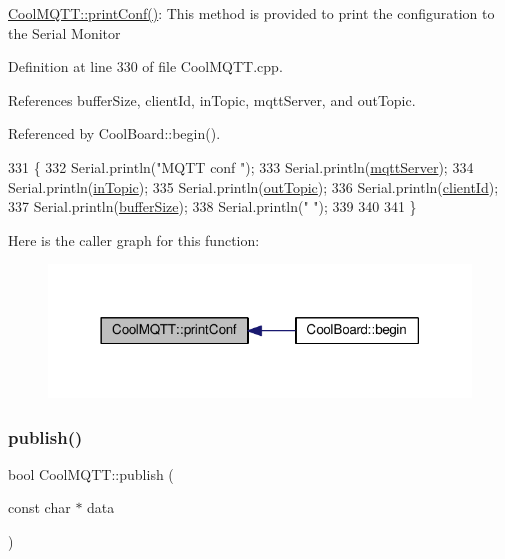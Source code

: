 \hyperlink{classCoolMQTT_a40553a0ad4b5ecf1cb4411ab54ca85fb}{Cool\+M\+Q\+T\+T\+::print\+Conf()}\+: This method is provided to print the configuration to the Serial Monitor 

Definition at line 330 of file Cool\+M\+Q\+T\+T.\+cpp.



References buffer\+Size, client\+Id, in\+Topic, mqtt\+Server, and out\+Topic.



Referenced by Cool\+Board\+::begin().


\begin{DoxyCode}
331 \{
332     Serial.println(\textcolor{stringliteral}{"MQTT conf "});
333     Serial.println(\hyperlink{classCoolMQTT_ab8bb951f87ddbf92db74c2ad16a3e53e}{mqttServer});
334     Serial.println(\hyperlink{classCoolMQTT_a4492f52a441e83cc5151010317fdb52d}{inTopic});
335     Serial.println(\hyperlink{classCoolMQTT_a109c786a17b463f9eeba046194279522}{outTopic});
336     Serial.println(\hyperlink{classCoolMQTT_af01bc6160c5a191e90df1b6e7318828d}{clientId});
337     Serial.println(\hyperlink{classCoolMQTT_a7f3cf26b51d6770f216e42c5ef13ca9f}{bufferSize});
338     Serial.println(\textcolor{stringliteral}{" "});
339 
340 
341 \}
\end{DoxyCode}
Here is the caller graph for this function\+:
\nopagebreak
\begin{figure}[H]
\begin{center}
\leavevmode
\includegraphics[width=318pt]{classCoolMQTT_a40553a0ad4b5ecf1cb4411ab54ca85fb_icgraph}
\end{center}
\end{figure}
\mbox{\label{classCoolMQTT_ace977b3e90ab14b1199fe5c4fb0a13ec}} 
\subsubsection{\texorpdfstring{publish()}{publish()}}
{\footnotesize\ttfamily bool Cool\+M\+Q\+T\+T\+::publish (\begin{DoxyParamCaption}\item[{const char $\ast$}]{data }\end{DoxyParamCaption})}

